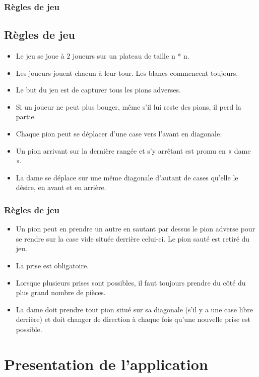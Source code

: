 \documentclass{beamer}
\begin{document}
\begin{frame}

  \frametitle{Règles de jeu}

  \subsection{Règles de jeu}

  \begin{itemize}
    \item Le jeu se joue à 2 joueurs sur un plateau de taille n * n.
    \item Les joueurs jouent chacun à leur tour. Les blancs commencent toujours.
    \item Le but du jeu est de capturer tous les pions adverses. 
    \item Si un joueur ne peut plus bouger, même s'il lui reste des pions, il perd la partie. 
    \item Chaque pion peut se déplacer d'une case vers l'avant en diagonale. 
    \item Un pion arrivant sur la dernière rangée et s'y arrêtant est promu en « dame ».
    \item La dame se déplace sur une même diagonale d'autant de cases qu'elle le désire, en avant et en arrière.
  
  \end{itemize}

\end{frame}

\begin{frame}
  \frametitle{Règles de jeu}
  \begin{itemize}
    \item Un pion peut en prendre un autre en sautant par dessus le pion adverse
     pour se rendre sur la case vide située derrière celui-ci. Le pion sauté est retiré du jeu.
    \item La prise est obligatoire.
    \item Lorsque plusieurs prises sont possibles, 
    il faut toujours prendre du côté du plus grand nombre de pièces.
    \item La dame doit prendre tout pion situé sur sa diagonale 
    (s'il y a une case libre derrière) et doit changer de direction à chaque 
    fois qu'une  nouvelle prise est possible. 
  \end{itemize}
\end{frame}

\section{Presentation de l'application}
\end{document}
